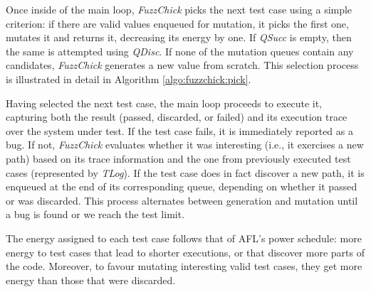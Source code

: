 \documentclass[acmsmall, anonymous]{acmart}
\newcommand{\fuzzchick}{\textit{FuzzChick}\xspace}
\begin{document}
Once inside of the main loop, \fuzzchick picks the next test case using a simple
criterion: if there are valid values enqueued for mutation, it picks the first
one, mutates it and returns it, decreasing its energy by one.
%
If \textit{QSucc} is empty, then the same is attempted using \textit{QDisc}.
%
If none of the mutation queues contain any candidates, \fuzzchick generates a
new value from scratch.
%
This selection process is illustrated in detail in Algorithm
\ref{algo:fuzzchick:pick}.


Having selected the next test case, the main loop proceeds to execute it,
capturing both the result (passed, discarded, or failed) and its execution trace
over the system under test.
%
If the test case fails, it is immediately reported as a bug.
%
If not, \fuzzchick evaluates whether it was interesting (i.e., it exercises a
new path) based on its trace information and the one from previously executed
test cases (represented by \textit{TLog}).
%
If the test case does in fact discover a new path, it is enqueued at the end of
its corresponding queue, depending on whether it passed or was discarded.
%
This process alternates between generation and mutation until a bug is found or
we reach the test limit.


The energy assigned to each test case follows that of AFL's power schedule: more
energy to test cases that lead to shorter executions, or that discover more
parts of the code.
%
Moreover, to favour mutating interesting valid test cases, they get more energy
than those that were discarded.
\end{document}
